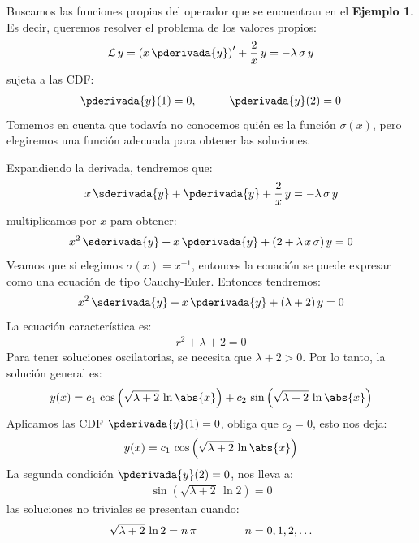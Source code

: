 \begin{ejemplo}
Buscamos las funciones propias del operador que se encuentran en el \textbf{Ejemplo 1}. Es decir, queremos resolver el problema de los valores propios:
\begin{align}
\mathcal{L} \, y = \left( x \, \pderivada{y} \right)^{\prime} + \dfrac{2}{x} \, y = - \lambda \, \sigma \, y
\label{eq:ecuacion_04_14}
\end{align}
sujeta a las CDF:
\begin{align*}
\pderivada{y} (1) = 0, \hspace{1cm} \pderivada{y}(2) = 0
\end{align*}
Tomemos en cuenta que todavía no conocemos quién es la función $\sigma (x)$, pero elegiremos una función adecuada para obtener las soluciones.
\par
\noindent
Expandiendo la derivada, tendremos que:
\begin{align*}
x \, \sderivada{y} + \pderivada{y} + \dfrac{2}{x} \, y = - \lambda \, \sigma \, y
\end{align*}
multiplicamos por $x$ para obtener:
\begin{align*}
x^{2} \, \sderivada{y} + x \, \pderivada{y} + (2 + \lambda \, x \,  \sigma) \, y = 0
\end{align*}
Veamos que si elegimos $\sigma(x) = x^{-1}$, entonces la ecuación se puede expresar como una ecuación de tipo Cauchy-Euler. Entonces tendremos:
\begin{align*}
x^{2} \, \sderivada{y} + x \, \pderivada{y} + (\lambda + 2) \, y = 0
\end{align*}
La ecuación característica es:
\begin{align*}
r^{2} + \lambda + 2 = 0
\end{align*}
Para tener soluciones oscilatorias, se necesita que $\lambda + 2 > 0$. Por lo tanto, la solución general es:
\begin{align}
y(x) = c_{1} \, \cos \left( \sqrt{\lambda + 2} \, \ln \abs{x} \right) + c_{2} \, \sin \left( \sqrt{\lambda + 2} \, \ln \abs{x} \right)
\label{eq:ecuacion_04_15}
\end{align}
Aplicamos las CDF $\pderivada{y}(1) = 0$, obliga que $c_{2} = 0$, esto nos deja:
\begin{align*}
y(x) = c_{1} \, \cos \left( \sqrt{\lambda + 2} \, \ln \abs{x} \right)
\end{align*}
La segunda condición $\pderivada{y}(2) = 0$, nos lleva a:
\begin{align*}
\sin \left( \sqrt{\lambda + 2} \, \ln 2 \right) = 0
\end{align*}
las soluciones no triviales se presentan cuando:
\begin{align*}
\sqrt{\lambda + 2} \, \ln 2 = n \, \pi \hspace{1.5cm} n = 0, 1, 2, \ldots
\end{align*}


\end{ejemplo}
